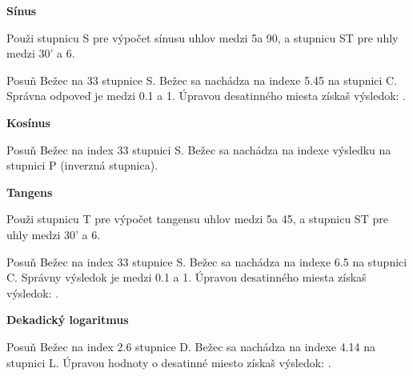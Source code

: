 \begin{multicols*}{3}
{  
  \textbf{Sínus}

\footnotesize Použi stupnicu S pre výpočet sínusu uhlov medzi 5\textdegree a 90\textdegree, a stupnicu ST pre uhly medzi 30' a 6\textdegree. \normalsize

Posuň Bežec na 33 stupnice S.
Bežec sa nachádza na indexe 5.45 na stupnici C.
Správna odpoveď je medzi 0.1 a 1. Úpravou desatinného miesta získaš výsledok: .

  \textbf{Kosínus}

Posuň Bežec na index 33 stupnici S.
Bežec sa nachádza na indexe výsledku  na stupnici P (inverzná stupnica).

  \textbf{Tangens}

\footnotesize Použi stupnicu T pre výpočet tangensu uhlov medzi 5\textdegree a 45\textdegree, a stupnicu ST pre uhly medzi 30' a 6\textdegree. \normalsize

Posuň Bežec na index 33 stupnice S.
Bežec sa nachádza na indexe 6.5 na stupnici C.
Správny výsledok je medzi 0.1 a 1. Úpravou desatinného miesta získaš výsledok: .

  \textbf{Dekadický logaritmus}

Posuň Bežec na index 2.6 stupnice D.
Bežec sa nachádza na indexe 4.14 na stupnici L.
Úpravou hodnoty o desatinné miesto získaš výsledok: .
  }
  \end{multicols*}
  

